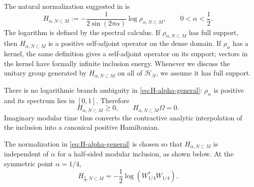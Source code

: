 \documentclass[a4paper,11pt]{article}
\theoremstyle{definition}
\begin{document}
The natural normalization suggested in \cite{} is
\begin{equation}
    \boxed{
    H_{\alpha,N\subset M}
    :=
    -\frac{1}{2\sin(2\pi\alpha)}
    \log
    \rho_{\alpha,N\subset M},
    \qquad
    0<\alpha<\frac12 .
    }
    \label{eq:H-alpha-general}
\end{equation}
The logarithm is defined by the spectral calculus. If
$\rho_{\alpha,N\subset M}$ has full support, then
$H_{\alpha,N\subset M}$ is a positive self-adjoint operator on the dense
domain. If $\rho_\alpha$ has a kernel, the same definition gives a self-adjoint
operator on its support; vectors in the kernel have formally infinite
inclusion energy. Whenever we discuss the unitary group generated by
$H_{\alpha,N\subset M}$ on all of $\mathcal H_N$, we assume it has full support. 

There is no logarithmic branch ambiguity in
\eqref{eq:H-alpha-general}: $\rho_\alpha$ is positive and its spectrum lies
in $[0,1]$. Therefore
\begin{equation}
    \boxed{
    H_{\alpha,N\subset M}\geq0,
    \qquad
    H_{\alpha,N\subset M}\Omega=0.
    }
    \label{eq:H-alpha-positive}
\end{equation}
Imaginary modular time thus converts the contractive analytic interpolation
of the inclusion into a canonical positive Hamiltonian.

The normalization in \eqref{eq:H-alpha-general} is chosen so that
$H_{\alpha,N\subset M}$ is independent of $\alpha$ for a half-sided
modular inclusion, as shown below. At the symmetric point $\alpha=1/4$,
\begin{equation}
    H_{\frac14,N\subset M}
    =
    -\frac12
    \log\left(W_{1/4}^*W_{1/4}\right).
    \label{eq:H-quarter}
\end{equation}
\end{document}
